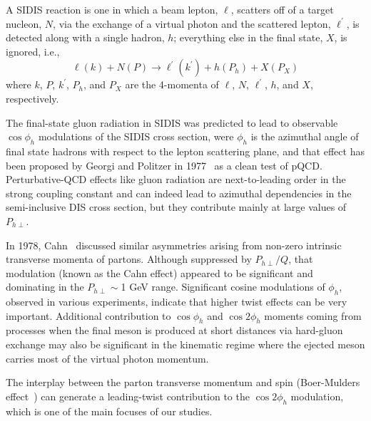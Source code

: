 \documentclass[aps,prl,twocolumn,showpacs,superscriptaddress,groupedaddress]{revtex4}  %
\newcommand{\Phperp}{P_{h\perp}}
\begin{document}
A SIDIS reaction is one in which a beam lepton, $\ell$, scatters off of a target nucleon, $N$, via the exchange of a virtual photon and the scattered lepton, $\ell^{\prime}$, is detected along with a single hadron, $h$; everything else in the final state, $X$, is ignored, i.e.,
\begin{equation}
\label{eq:sidis}
\ell (k) + N(P) \rightarrow \ell^{\prime} (k^{\prime} ) + h(P_{h}) + X(P_{X})
\end{equation}
where $k$, $P$, $k^{\prime}$, $P_{h}$, and $P_{X}$ are the 4-momenta of $\ell$, $N$, $\ell^{\prime}$, $h$, and $X$, respectively.

 The final-state gluon radiation in SIDIS  was predicted to lead to observable $\cos\phi_h$ modulations of the SIDIS cross section,
were $\phi_h$ is the azimuthal angle of final state hadrons with respect to the lepton scattering plane,
and that effect has been  proposed by Georgi and Politzer in  1977~\cite{Georgi:1977tv}  as a clean test of pQCD.
Perturbative-QCD effects like gluon radiation are next-to-leading order in the strong coupling constant and can indeed lead to azimuthal
dependencies in the semi-inclusive DIS cross section, but they contribute mainly at large values of $\Phperp$.

In 1978, Cahn~\cite{Cahn:1978se}   discussed  similar asymmetries arising from non-zero intrinsic transverse momenta of partons.
Although suppressed by $P_{h\perp}/Q$,  that modulation (known as the Cahn effect) appeared to be significant and dominating in the $P_{h\perp} \sim $1 GeV range.
Significant cosine modulations of $\phi_h$, observed in various experiments, indicate that higher twist effects can be very important.
Additional contribution to $\cos \phi_h$ and $\cos 2\phi_h$ moments coming from processes when the final meson
is produced at short distances via hard-gluon exchange \cite{Berger:1979xz} may also be 
significant in the kinematic regime where the ejected meson carries  most of 
the virtual photon momentum.

The interplay between the parton transverse momentum and spin
(Boer-Mulders effect~\cite{Boer:1997nt}) can generate a leading-twist
contribution to the $\cos 2\phi_h$ modulation, which is one of the main focuses of our studies.
\end{document}
